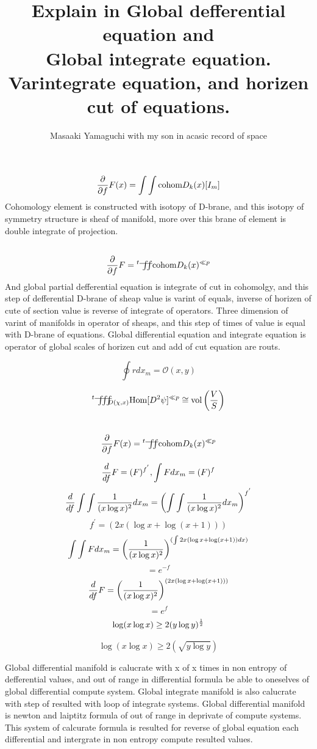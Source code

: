 \documentclass{jsarticle}
\begin{document}
\newpage
\title{Explain in Global defferential equation and \\
Global integrate equation. \\
Varintegrate equation, and horizen cut of equations.}
\author{Masaaki Yamaguchi with my son in acasic record of space}




 $$ {\partial \over \partial f}F(x) = \int \int \text{cohom}D_k(x)[I_m]  $$
 Cohomology element is constructed with isotopy of D-brane,
 and this isotopy of symmetry structure is sheaf of manifold,
 more over this brane of element is double integrate of projection.
 $$ {\partial \over \partial f}F = {{}^t \variint} \text{cohom}D_k(x)^{\ll p} $$
 And global partial defferential equation is integrate of cut in cohomolgy,
 and this step of defferential D-brane of sheap value is varint of equals,
 inverse of horizen of cute of section value is reverse of integrate of 
 operators. Three dimension of varint of manifolds in operator of sheaps,
 and this step of times of value is equal with D-brane of equations.
 Global differential equation and integrate equation is operator of 
 global scales of horizen cut and add of cut equation are routs.

 $$ \oint r dx_m = \mathcal{O}(x,y) $$

 $$ {{}^t \variiint}_{{D(\chi,x)}} \text{Hom}[D^2 \psi]^{\ll p} \cong 
 \text{vol}\left({V \over S}\right) $$

 $$ {\partial \over \partial f}F(x) = {{}^t \variint} 
 \text{cohom}D_k(x)^{\ll p} $$

 $$ {d \over df}F = (F)^{f^{'}}, \int F dx_m = (F)^{f}  $$
 $$ {d \over df}\int \int{1 \over (x \log x)^2}dx_m =
 \left(\int \int{1 \over (x \log x)^2}dx_m \right)^{f^{'}}  $$
 $$ f^{'} = (2x (\log x + \log (x + 1))) $$
  $$  \int \int F dx_m = \left({1 \over (x \log x)^2}\right)^{
	  (\int 2x (\log x + \log (x + 1))dx)} $$ 
   $$= e^{-f} $$
  $$ {d \over df}F = \left({1 \over (x \log x)^2}\right)^{
	  (2x (\log x + \log (x + 1))) } $$  
  $$= e^{f} $$
  $$ \log (x \log x) \ge 2(y \log y)^{1 \over 2} $$

  $$ \log (x \log x) \ge 2(\sqrt{y \log y}) $$

  Global differential manifold is calucrate with x of x times in non
  entropy of defferential values, and out of range in differential formula
  be able to oneselves of global differential compute system.
  Global integrate manifold is also calucrate with step of resulted with
  loop of integrate systems. Global differential manifold is newton and 
  laiptitz formula of out of range in deprivate of compute systems.
  This system of calcurate formula is resulted for reverse of global equation
  each differential and intergrate in non entropy compute resulted values.
\end{document}
